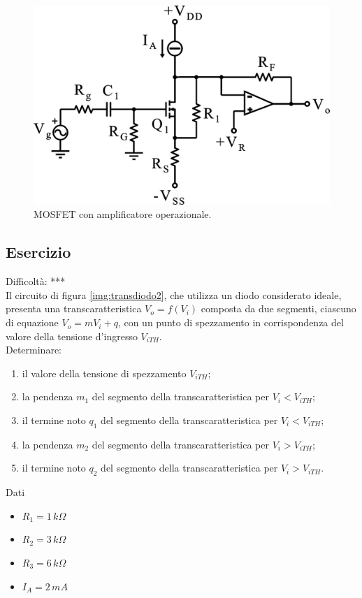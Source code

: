 \documentclass[a4paper,portrait,12pt]{article}
\theoremstyle{definition}
\begin{document}
\begin{figure}[H]
\centering
\includegraphics[width=.5\linewidth]{img/elettronicaEs/MOSampli.pdf}
\caption{MOSFET con amplificatore operazionale.}
\label{img:MOSampli}
\end{figure}


\subsection{Esercizio}

Difficoltà: ***\\

Il circuito di figura \ref{img:transdiodo2}, che utilizza un diodo considerato ideale, presenta una 
transcaratteristica $V_o = f(V_i)$ composta da due segmenti, ciascuno di equazione $V_o=m V_i+q$, con un 
punto di spezzamento in corrispondenza del valore della tensione d'ingresso $V_{iTH}$.\\ 

Determinare:
\begin{enumerate}
\item il valore della tensione di spezzamento $V_{iTH}$;
\item la pendenza $m_1$ del segmento della transcaratteristica per $V_i < V_{iTH}$;
\item il termine noto $q_1$ del segmento della transcaratteristica per $V_i < V_{iTH}$;
\item la pendenza $m_2$ del segmento della transcaratteristica per $V_i > V_{iTH}$;
\item il termine noto $q_2$ del segmento della transcaratteristica per $V_i > V_{iTH}$.
\end{enumerate}

Dati
\begin{itemize}
\item $R_1=1\,k\Omega$ 
\item $R_2=3\,k\Omega$
\item $R_3=6\,k\Omega$
\item $I_A=2\,mA$
\end{itemize}
\end{document}
